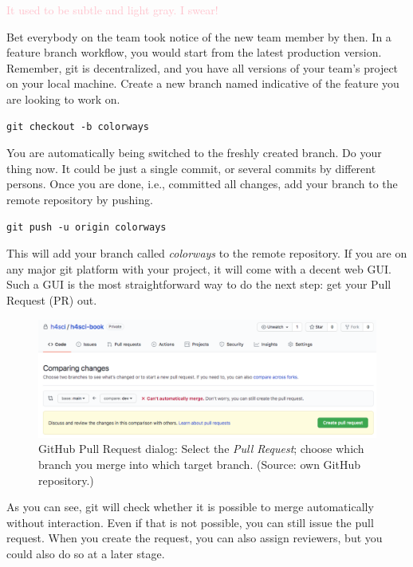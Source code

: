 \documentclass[
  12pt,
  letterpaper,
]{krantz}
\begin{document}
\textcolor{pink}{It used to be subtle and light gray. I swear!}

Bet everybody on the team took notice of the new team member by then. In
a feature branch workflow, you would start from the latest production
version. Remember, git is decentralized, and you have all versions of
your team's project on your local machine. Create a new branch named
indicative of the feature you are looking to work on.

\begin{verbatim}
git checkout -b colorways
\end{verbatim}

You are automatically being switched to the freshly created branch. Do
your thing now. It could be just a single commit, or several commits by
different persons. Once you are done, i.e., committed all
changes, add your branch to the remote repository by
pushing.

\begin{verbatim}
git push -u origin colorways
\end{verbatim}

This will add your branch called \emph{colorways} to the remote
repository. If you are on any major git platform with your project, it
will come with a decent web GUI. Such a GUI is the most straightforward
way to do the next step: get your Pull Request (PR)
out.

\begin{figure}

{\centering \includegraphics{./images/pr.png}

}

\caption{GitHub Pull Request dialog: Select the \emph{Pull
Request}; choose which branch you merge into which target branch.
(Source: own GitHub repository.)}

\end{figure}

As you can see, git will check whether it is possible to merge
automatically without interaction. Even if that is not possible, you can
still issue the pull request. When you create the
request, you can also assign reviewers, but you could also do so at a
later stage.
\end{document}
